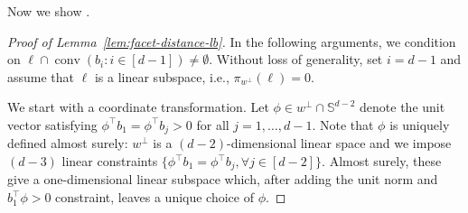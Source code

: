 \documentclass{theoretics}
\newcommand{\T}{\top}
\newcommand{\conv}{\operatorname{conv}}
\begin{document}
Now we show .
\begin{proof}[Proof of Lemma~\ref{lem:facet-distance-lb}]\label{sec:proof-facet-distance-lb}
In the following arguments, we condition on $\ell \cap \conv(b_i : i\in [d-1]) \neq \emptyset$.
Without loss of generality, set $i = d-1$ and assume that $\ell$
is a linear subspace, i.e., $\pi_{w^\perp}(\ell)=0$.

We start with a coordinate transformation.
Let $\phi \in w^\perp \cap \mathbb S ^{d-2}$ denote the unit vector
satisfying $\phi^\T b_1 = \phi^\T b_j > 0$ for all $j = 1,\dots,d-1$.
Note that $\phi$ is uniquely defined almost surely: $w^\perp$ is a $(d-2)$-dimensional linear space
and we impose $(d-3)$ linear constraints $\{\phi^\top b_1 = \phi^\top b_j, \forall j \in [d-2] \}$.
Almost surely, these give a one-dimensional linear subspace which,
after adding the unit norm and $b_1^\T \phi > 0$ constraint, leaves a unique choice of $\phi$.


\end{proof}
\end{document}

